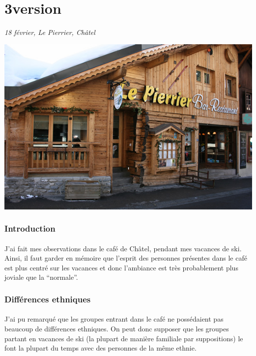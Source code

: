 \section{3\ieme version}

\paragraph{}
\emph{18 février, Le Pierrier, Châtel}
\begin{center}
\includegraphics[scale=0.5]{pierrier.jpg}
\end{center}

\subsubsection{Introduction}
\paragraph{}
J'ai fait mes observations dans le café de Châtel, pendant mes vacances de ski.
Ainsi, il faut garder en mémoire que l'esprit des personnes présentes dans le
café est plus centré sur les vacances et donc l'ambiance est très probablement
plus joviale que la ``normale''.

\subsubsection{Différences ethniques}
\paragraph{}
J'ai pu remarqué que les groupes entrant dans le café ne possédaient pas
beaucoup de différences ethniques. On peut donc supposer que les groupes
partant en vacances de ski (la plupart de manière familiale par suppositions)
le font la plupart du temps avec des personnes de la même ethnie.

